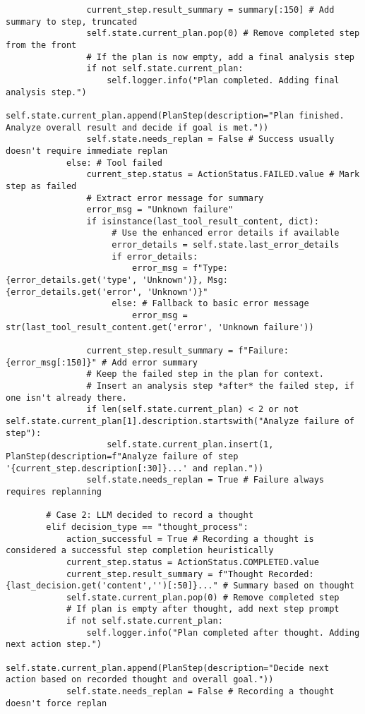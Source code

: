 \documentclass[12pt,a4paper]{article}
\begin{document}
\begin{pageablecode}
\begin{verbatim}
                current_step.result_summary = summary[:150] # Add summary to step, truncated
                self.state.current_plan.pop(0) # Remove completed step from the front
                # If the plan is now empty, add a final analysis step
                if not self.state.current_plan:
                    self.logger.info("Plan completed. Adding final analysis step.")
                    self.state.current_plan.append(PlanStep(description="Plan finished. Analyze overall result and decide if goal is met."))
                self.state.needs_replan = False # Success usually doesn't require immediate replan
            else: # Tool failed
                current_step.status = ActionStatus.FAILED.value # Mark step as failed
                # Extract error message for summary
                error_msg = "Unknown failure"
                if isinstance(last_tool_result_content, dict):
                     # Use the enhanced error details if available
                     error_details = self.state.last_error_details
                     if error_details:
                         error_msg = f"Type: {error_details.get('type', 'Unknown')}, Msg: {error_details.get('error', 'Unknown')}"
                     else: # Fallback to basic error message
                         error_msg = str(last_tool_result_content.get('error', 'Unknown failure'))

                current_step.result_summary = f"Failure: {error_msg[:150]}" # Add error summary
                # Keep the failed step in the plan for context.
                # Insert an analysis step *after* the failed step, if one isn't already there.
                if len(self.state.current_plan) < 2 or not self.state.current_plan[1].description.startswith("Analyze failure of step"):
                    self.state.current_plan.insert(1, PlanStep(description=f"Analyze failure of step '{current_step.description[:30]}...' and replan."))
                self.state.needs_replan = True # Failure always requires replanning

        # Case 2: LLM decided to record a thought
        elif decision_type == "thought_process":
            action_successful = True # Recording a thought is considered a successful step completion heuristically
            current_step.status = ActionStatus.COMPLETED.value
            current_step.result_summary = f"Thought Recorded: {last_decision.get('content','')[:50]}..." # Summary based on thought
            self.state.current_plan.pop(0) # Remove completed step
            # If plan is empty after thought, add next step prompt
            if not self.state.current_plan:
                self.logger.info("Plan completed after thought. Adding next action step.")
                self.state.current_plan.append(PlanStep(description="Decide next action based on recorded thought and overall goal."))
            self.state.needs_replan = False # Recording a thought doesn't force replan


\end{verbatim}
\end{pageablecode}
\end{document}
